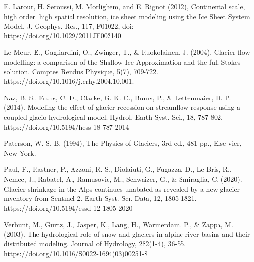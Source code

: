 \documentclass{article}
\begin{document}
\begin{thebibliography}{99}
    E. Larour, H. Seroussi, M. Morlighem, and E. Rignot (2012), Continental scale, high order, high spatial resolution, ice sheet modeling using the Ice Sheet System Model, J. Geophys. Res., 117, F01022, doi: https://doi.org/10.1029/2011JF002140 

    Le Meur, E., Gagliardini, O., Zwinger, T., \& Ruokolainen, J. (2004). Glacier flow modelling: a comparison of the Shallow Ice Approximation and the full-Stokes solution. Comptes Rendus Physique, 5(7), 709-722. https://doi.org/10.1016/j.crhy.2004.10.001. 

    Naz, B. S., Frans, C. D., Clarke, G. K. C., Burns, P., \& Lettenmaier, D. P. (2014). Modeling the effect of glacier recession on streamflow response using a coupled glacio-hydrological model. Hydrol. Earth Syst. Sci., 18, 787-802. https://doi.org/10.5194/hess-18-787-2014 

    Paterson, W. S. B. (1994), The Physics of Glaciers, 3rd ed., 481 pp., Else-vier, New York. 

    Paul, F., Rastner, P., Azzoni, R. S., Diolaiuti, G., Fugazza, D., Le Bris, R., Nemec, J., Rabatel, A., Ramusovic, M., Schwaizer, G., \& Smiraglia, C. (2020). Glacier shrinkage in the Alps continues unabated as revealed by a new glacier inventory from Sentinel-2. Earth Syst. Sci. Data, 12, 1805-1821. https://doi.org/10.5194/essd-12-1805-2020 

    Verbunt, M., Gurtz, J., Jasper, K., Lang, H., Warmerdam, P., \& Zappa, M. (2003). The hydrological role of snow and glaciers in alpine river basins and their distributed modeling. Journal of Hydrology, 282(1-4), 36-55. https://doi.org/10.1016/S0022-1694(03)00251-8 
\end{thebibliography}
    
\end{document}
